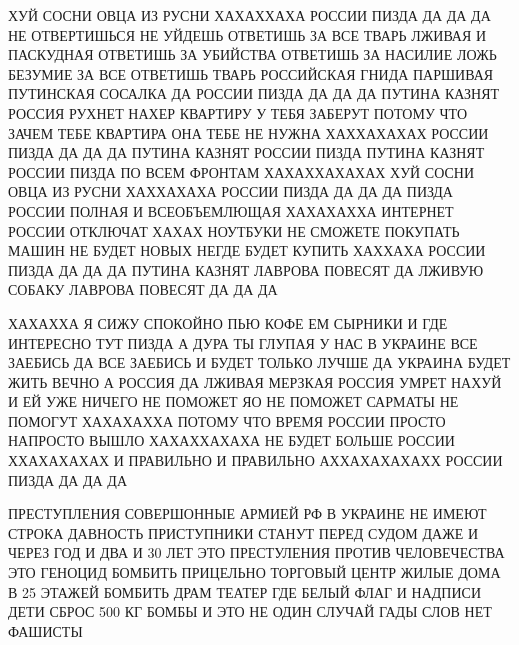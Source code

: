  
 
 
 
 

ХУЙ СОСНИ ОВЦА ИЗ РУСНИ ХАХАХХАХА РОССИИ ПИЗДА ДА ДА ДА 
НЕ ОТВЕРТИШЬСЯ НЕ УЙДЕШЬ ОТВЕТИШЬ ЗА ВСЕ ТВАРЬ ЛЖИВАЯ И ПАСКУДНАЯ
ОТВЕТИШЬ ЗА УБИЙСТВА ОТВЕТИШЬ ЗА НАСИЛИЕ ЛОЖЬ БЕЗУМИЕ 
ЗА ВСЕ ОТВЕТИШЬ ТВАРЬ РОССИЙСКАЯ ГНИДА ПАРШИВАЯ ПУТИНСКАЯ СОСАЛКА
ДА РОССИИ ПИЗДА ДА ДА ДА ПУТИНА КАЗНЯТ РОССИЯ РУХНЕТ НАХЕР
КВАРТИРУ У ТЕБЯ ЗАБЕРУТ ПОТОМУ ЧТО ЗАЧЕМ ТЕБЕ КВАРТИРА 
ОНА ТЕБЕ НЕ НУЖНА ХАХХАХАХАХ РОССИИ ПИЗДА ДА ДА ДА
ПУТИНА КАЗНЯТ РОССИИ ПИЗДА ПУТИНА КАЗНЯТ РОССИИ ПИЗДА ПО ВСЕМ ФРОНТАМ
ХАХАХХАХАХАХ ХУЙ СОСНИ ОВЦА ИЗ РУСНИ ХАХХАХАХА РОССИИ ПИЗДА ДА ДА ДА 
ПИЗДА РОССИИ ПОЛНАЯ И ВСЕОБЪЕМЛЮЩАЯ ХАХАХАХХА ИНТЕРНЕТ РОССИИ ОТКЛЮЧАТ ХАХАХ
НОУТБУКИ НЕ СМОЖЕТЕ ПОКУПАТЬ МАШИН НЕ БУДЕТ НОВЫХ НЕГДЕ БУДЕТ КУПИТЬ ХАХХАХА
РОССИИ ПИЗДА ДА ДА ДА ПУТИНА КАЗНЯТ ЛАВРОВА ПОВЕСЯТ ДА ЛЖИВУЮ СОБАКУ ЛАВРОВА
ПОВЕСЯТ ДА ДА ДА

ХАХАХХА Я СИЖУ СПОКОЙНО ПЬЮ КОФЕ ЕМ СЫРНИКИ И ГДЕ ИНТЕРЕСНО ТУТ ПИЗДА А ДУРА ТЫ
ГЛУПАЯ У НАС В УКРАИНЕ ВСЕ ЗАЕБИСЬ ДА ВСЕ ЗАЕБИСЬ И БУДЕТ ТОЛЬКО ЛУЧШЕ ДА
УКРАИНА БУДЕТ ЖИТЬ ВЕЧНО А РОССИЯ ДА ЛЖИВАЯ МЕРЗКАЯ РОССИЯ УМРЕТ НАХУЙ И ЕЙ УЖЕ
НИЧЕГО НЕ ПОМОЖЕТ ЯО НЕ ПОМОЖЕТ САРМАТЫ НЕ ПОМОГУТ ХАХАХАХХА ПОТОМУ ЧТО ВРЕМЯ
РОССИИ ПРОСТО НАПРОСТО ВЫШЛО ХАХАХХАХАХА НЕ БУДЕТ БОЛЬШЕ РОССИИ ХХАХАХАХАХ И
ПРАВИЛЬНО И ПРАВИЛЬНО АХХАХАХАХАХХ РОССИИ ПИЗДА ДА ДА ДА

ПРЕСТУПЛЕНИЯ СОВЕРШОННЫЕ АРМИЕЙ РФ В УКРАИНЕ
НЕ ИМЕЮТ СТРОКА ДАВНОСТЬ
ПРИСТУПНИКИ СТАНУТ ПЕРЕД СУДОМ ДАЖЕ И ЧЕРЕЗ ГОД И ДВА И 30 ЛЕТ ЭТО ПРЕСТУЛЕНИЯ ПРОТИВ ЧЕЛОВЕЧЕСТВА ЭТО ГЕНОЦИД
БОМБИТЬ ПРИЦЕЛЬНО ТОРГОВЫЙ ЦЕНТР
ЖИЛЫЕ ДОМА В 25 ЭТАЖЕЙ
БОМБИТЬ ДРАМ ТЕАТЕР ГДЕ БЕЛЫЙ ФЛАГ И НАДПИСИ ДЕТИ
СБРОС 500 КГ БОМБЫ И ЭТО НЕ ОДИН СЛУЧАЙ
ГАДЫ СЛОВ НЕТ ФАШИСТЫ

